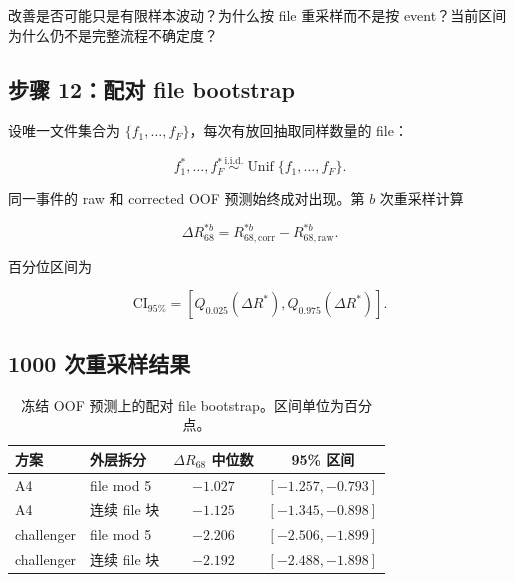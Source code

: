 \documentclass[UTF8,12pt,a4paper,oneside,fontset=none]{ctexart}
\numberwithin{equation}{section}
\newcommand{\Rsixtyeight}{R_{68}}
\begin{document}
\begin{questionbox}
改善是否可能只是有限样本波动？为什么按 file 重采样而不是按 event？当前区间为什么仍不是完整流程不确定度？
\end{questionbox}

\subsection{步骤 12：配对 file bootstrap}

设唯一文件集合为 \(\{f_1,\ldots,f_F\}\)，每次有放回抽取同样数量的 file：

\begin{equation}
f_1^{\ast},\ldots,f_F^{\ast}
\overset{\mathrm{i.i.d.}}{\sim}
\operatorname{Unif}\{f_1,\ldots,f_F\}.
\label{eq:file-bootstrap}
\end{equation}

同一事件的 raw 和 corrected OOF 预测始终成对出现。第 \(b\) 次重采样计算

\begin{equation}
\Delta\Rsixtyeight^{\ast b}
=
R_{68,\mathrm{corr}}^{\ast b}
-
R_{68,\mathrm{raw}}^{\ast b}.
\label{eq:bootstrap-delta}
\end{equation}

百分位区间为

\begin{equation}
\mathrm{CI}_{95\%}
=
\left[
Q_{0.025}\!\left(\Delta R^{\ast}\right),
Q_{0.975}\!\left(\Delta R^{\ast}\right)
\right].
\label{eq:bootstrap-ci}
\end{equation}

\subsection{1000 次重采样结果}

\begin{table}[H]
\centering
\caption{冻结 OOF 预测上的配对 file bootstrap。区间单位为百分点。}
\label{tab:bootstrap-results}
\begin{tabular}{llcc}
\toprule
方案 & 外层拆分 & \(\Delta\Rsixtyeight\) 中位数 & 95\% 区间 \\
\midrule
A4 & file mod 5 & $-1.027$ & $[-1.257,-0.793]$ \\
A4 & 连续 file 块 & $-1.125$ & $[-1.345,-0.898]$ \\
challenger & file mod 5 & $-2.206$ & $[-2.506,-1.899]$ \\
challenger & 连续 file 块 & $-2.192$ & $[-2.488,-1.898]$ \\
\bottomrule
\end{tabular}
\end{table}
\end{document}
